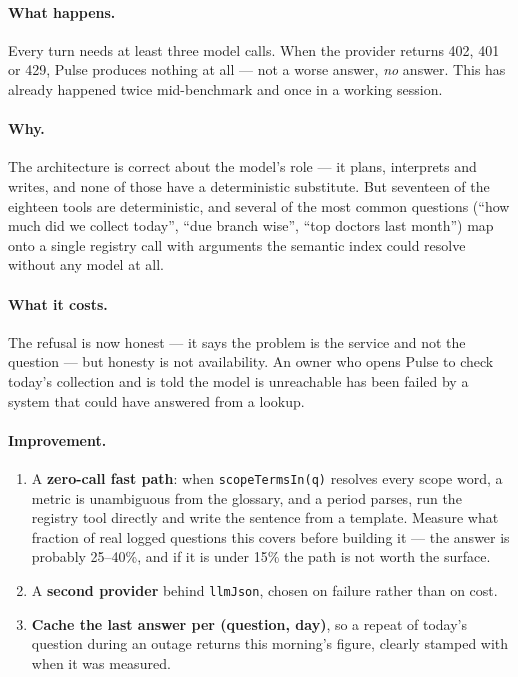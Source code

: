 \documentclass[11pt,a4paper]{report}
\newcommand{\code}[1]{\texttt{\small #1}}
\begin{document}
\paragraph{What happens.} Every turn needs at least three model calls. When the provider returns
402, 401 or 429, Pulse produces nothing at all --- not a worse answer, \emph{no} answer. This has
already happened twice mid-benchmark and once in a working session.

\paragraph{Why.} The architecture is correct about the model's role --- it plans, interprets and
writes, and none of those have a deterministic substitute. But seventeen of the eighteen tools are
deterministic, and several of the most common questions (``how much did we collect today'', ``due
branch wise'', ``top doctors last month'') map onto a single registry call with arguments the
semantic index could resolve without any model at all.

\paragraph{What it costs.} The refusal is now honest --- it says the problem is the service and not
the question --- but honesty is not availability. An owner who opens Pulse to check today's
collection and is told the model is unreachable has been failed by a system that could have
answered from a lookup.

\paragraph{Improvement.}
\begin{enumerate}[leftmargin=*,itemsep=1pt]
\item A \textbf{zero-call fast path}: when \code{scopeTermsIn(q)} resolves every scope word, a
      metric is unambiguous from the glossary, and a period parses, run the registry tool directly
      and write the sentence from a template. Measure what fraction of real logged questions this
      covers before building it --- the answer is probably 25--40\%, and if it is under 15\% the
      path is not worth the surface.
\item A \textbf{second provider} behind \code{llmJson}, chosen on failure rather than on cost.
\item \textbf{Cache the last answer per (question, day)}, so a repeat of today's question during an
      outage returns this morning's figure, clearly stamped with when it was measured.
\end{enumerate}
\end{document}
